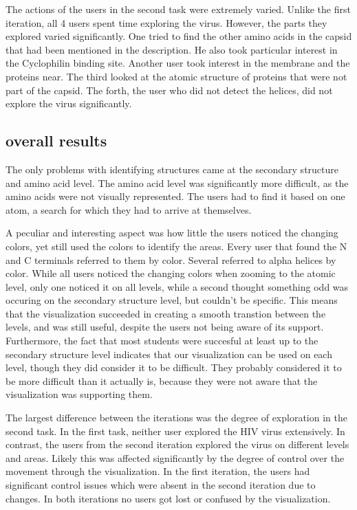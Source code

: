 \documentclass[review,journal]{vgtc}         %
\begin{document}
The actions of the users in the second task were extremely varied. 
Unlike the first iteration, all 4 users spent time exploring the virus. 
However, the parts they explored varied significantly. 
One tried to find the other amino acids in the capsid that had been mentioned in the description. 
He also took particular interest in the Cyclophilin binding site. 
Another user took interest in the membrane and the proteins near. 
The third looked at the atomic structure of proteins that were not part of the capsid. 
The forth, the user who did not detect the helices, did not explore the virus significantly.



\subsection{overall results}
The only problems with identifying structures came at the secondary structure and amino acid level. 
The amino acid level was significantly more difficult, as the amino acids were not visually represented. 
The users had to find it based on one atom, a search for which they had to arrive at themselves. 

A peculiar and interesting aspect was how little the users noticed the changing colors, yet still used the colors to identify the areas.
Every user that found the N and C terminals referred to them by color. 
Several referred to alpha helices by color. 
While all users noticed the changing colors when zooming to the atomic level, only one noticed it on all levels, while a second thought something odd was occuring on the secondary structure level, but couldn't be specific. 
This means that the visualization succeeded in creating a smooth transtion between the levels, and was still useful, despite the users not being aware of its support. 
Furthermore, the fact that most students were succesful at least up to the secondary structure level indicates that our visualization can be used on each level, though they did consider it to be difficult. 
They probably considered it to be more difficult than it actually is, because they were not aware that the visualization was supporting them.

The largest difference between the iterations was the degree of exploration in the second task. In the first task, neither user explored the HIV virus extensively. In contrast, the users from the second iteration explored the virus on different levels and areas. Likely this was affected significantly by the degree of control over the movement through the visualization. In the first iteration, the users had significant control issues which were absent in the second iteration due to changes. In both iterations no users got lost or confused by the visualization.
\end{document}
